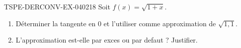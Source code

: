 \begin{exercice}{TSPE-DERCONV-EX-040}{2}{18}
Soit $f(x) = \sqrt{1+x}$.
\begin{enumerate}
  \item Déterminer la tangente en $0$ et l'utiliser comme approximation de $\sqrt{1{,}1}$.
  \item L'approximation est-elle par exces ou par defaut ? Justifier.
\end{enumerate}

\end{exercice}
